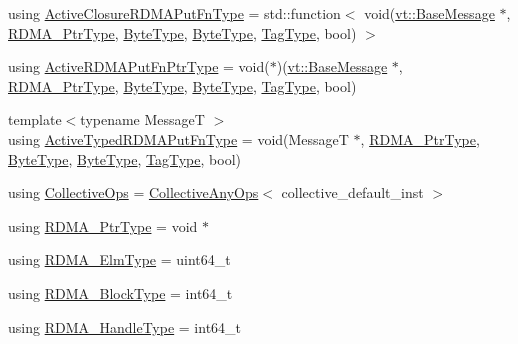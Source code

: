 \begin{DoxyCompactItemize}
\item 
using \hyperlink{namespacevt_ab526cbb2c45e18f3e7ba7d7727e5b0de}{Active\+Closure\+R\+D\+M\+A\+Put\+Fn\+Type} = std\+::function$<$ void(\hyperlink{namespacevt_ac34f95a5e2b8109b55bfba52b074443d}{vt\+::\+Base\+Message} $\ast$, \hyperlink{namespacevt_a9e2c953286c7616f7c218e9951790776}{R\+D\+M\+A\+\_\+\+Ptr\+Type}, \hyperlink{namespacevt_aab8d55968084610ce3b17057981e9300}{Byte\+Type}, \hyperlink{namespacevt_aab8d55968084610ce3b17057981e9300}{Byte\+Type}, \hyperlink{namespacevt_a84ab281dae04a52a4b243d6bf62d0e52}{Tag\+Type}, bool) $>$
\item 
using \hyperlink{namespacevt_a23220eaaee4345f7371d35e3aee23c70}{Active\+R\+D\+M\+A\+Put\+Fn\+Ptr\+Type} = void($\ast$)(\hyperlink{namespacevt_ac34f95a5e2b8109b55bfba52b074443d}{vt\+::\+Base\+Message} $\ast$, \hyperlink{namespacevt_a9e2c953286c7616f7c218e9951790776}{R\+D\+M\+A\+\_\+\+Ptr\+Type}, \hyperlink{namespacevt_aab8d55968084610ce3b17057981e9300}{Byte\+Type}, \hyperlink{namespacevt_aab8d55968084610ce3b17057981e9300}{Byte\+Type}, \hyperlink{namespacevt_a84ab281dae04a52a4b243d6bf62d0e52}{Tag\+Type}, bool)
\item 
{\footnotesize template$<$typename MessageT $>$ }\\using \hyperlink{namespacevt_a881ee9bd1e4e71905da1f563ee26ce25}{Active\+Typed\+R\+D\+M\+A\+Put\+Fn\+Type} = void(MessageT $\ast$, \hyperlink{namespacevt_a9e2c953286c7616f7c218e9951790776}{R\+D\+M\+A\+\_\+\+Ptr\+Type}, \hyperlink{namespacevt_aab8d55968084610ce3b17057981e9300}{Byte\+Type}, \hyperlink{namespacevt_aab8d55968084610ce3b17057981e9300}{Byte\+Type}, \hyperlink{namespacevt_a84ab281dae04a52a4b243d6bf62d0e52}{Tag\+Type}, bool)
\item 
using \hyperlink{namespacevt_a776b30f114cff62549e798fedeb6222b}{Collective\+Ops} = \hyperlink{structvt_1_1_collective_any_ops}{Collective\+Any\+Ops}$<$ collective\+\_\+default\+\_\+inst $>$
\item 
using \hyperlink{namespacevt_a9e2c953286c7616f7c218e9951790776}{R\+D\+M\+A\+\_\+\+Ptr\+Type} = void $\ast$
\item 
using \hyperlink{namespacevt_a2c2a902092b72056f70210c159f966f0}{R\+D\+M\+A\+\_\+\+Elm\+Type} = uint64\+\_\+t
\item 
using \hyperlink{namespacevt_ae54d2ca8f6bb4d65faf65118c82cd6f7}{R\+D\+M\+A\+\_\+\+Block\+Type} = int64\+\_\+t
\item 
using \hyperlink{namespacevt_a10442579ec4e7ebef223818e64bcf908}{R\+D\+M\+A\+\_\+\+Handle\+Type} = int64\+\_\+t
\item 

\end{DoxyCompactItemize}
